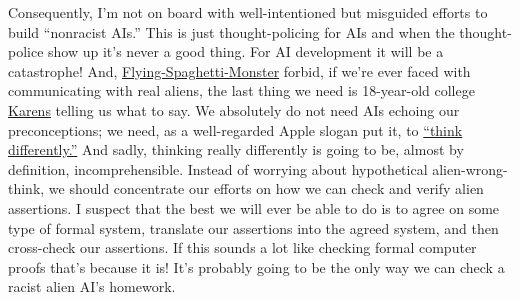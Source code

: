 Consequently, I'm not on board with well-intentioned but misguided
efforts to build ``nonracist AIs.'' This is just thought-policing for
AIs and when the thought-police show up it's never a good thing. For AI
development it will be a catastrophe! And,
\href{https://www.spaghettimonster.org/}{Flying-Spaghetti-Monster}
forbid, if we're ever faced with communicating with real aliens, the
last thing we need is 18-year-old college
\href{https://slangit.com/meaning/karen}{Karens} telling us what to say.
We absolutely do not need AIs echoing our preconceptions; we need, as a
well-regarded Apple slogan put it, to
\href{https://genius.com/Apple-inc-think-different-ad-annotated}{``think
differently.''} And sadly, thinking really differently is going to be,
almost by definition, incomprehensible. Instead of worrying about
hypothetical alien-wrong-think, we should concentrate our efforts on how
we can check and verify alien assertions. I suspect that the best we
will ever be able to do is to agree on some type of formal system,
translate our assertions into the agreed system, and then cross-check
our assertions. If this sounds a lot like checking formal computer
proofs that's because it is! It's probably going to be the only way we
can check a racist alien AI's homework.


%

